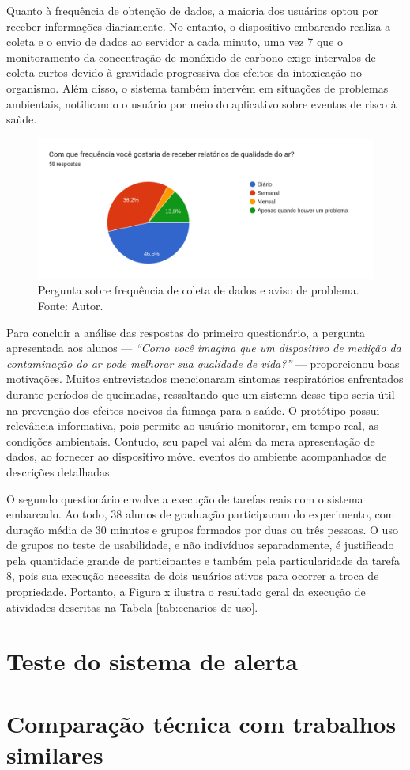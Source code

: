 Quanto à frequência de obtenção de dados, a maioria dos usuários optou por receber informações diariamente. No entanto, o dispositivo embarcado realiza a coleta e o envio de dados ao servidor a cada minuto, uma vez 7
que o monitoramento da concentração de monóxido de carbono exige intervalos de coleta curtos devido à gravidade progressiva dos efeitos da intoxicação no organismo. Além disso, o sistema também intervém em situações 
de problemas ambientais, notificando o usuário por meio do aplicativo sobre eventos de risco à saùde.

\begin{figure}[ht]
    \centering
    \includegraphics[width=.64\textwidth]{img/questionario/1/graf-info-frequencia.png}
    \caption{Pergunta sobre frequência de coleta de dados e aviso de problema. Fonte: Autor.}\label{grafFrequenciaInfo}
\end{figure}

Para concluir a análise das respostas do primeiro questionário, a pergunta apresentada aos alunos — \textit{``Como você imagina que um dispositivo de medição da contaminação do ar pode melhorar sua qualidade de vida?''} — proporcionou boas motivações. Muitos 
entrevistados mencionaram sintomas respiratórios enfrentados durante períodos de queimadas, ressaltando que um sistema desse tipo seria útil na prevenção dos efeitos nocivos da fumaça para a saúde. O protótipo possui 
relevância informativa, pois permite ao usuário monitorar, em tempo real, as condições ambientais. Contudo, seu papel vai além da mera apresentação de dados, ao fornecer ao dispositivo móvel eventos do ambiente 
acompanhados de descrições detalhadas.

O segundo questionário envolve a execução de tarefas reais com o sistema embarcado. Ao todo, 38 alunos de graduação participaram 
do experimento, com duração média de 30 minutos e grupos formados por duas ou três pessoas. O uso de grupos no teste de usabilidade, e não indivíduos separadamente, é justificado 
pela quantidade grande de participantes e também pela particularidade da tarefa 8, pois sua execução necessita de dois usuários ativos para ocorrer a troca de propriedade. Portanto, 
a Figura x ilustra o resultado geral da execução de atividades descritas na Tabela \ref{tab:cenarios-de-uso}. 

\section{Teste do sistema de alerta}\label{alerta}

\section{Comparação técnica com trabalhos similares}\label{comparacao}